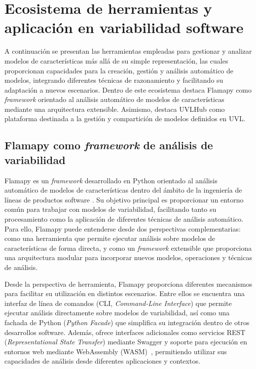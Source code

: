 \section{Ecosistema de herramientas y aplicación en variabilidad software}
\label{sec:ecosistema_herramientas}

A continuación se presentan las herramientas empleadas para gestionar y analizar modelos de características más allá de su simple representación, las cuales proporcionan capacidades para la creación, gestión y análisis automático de modelos, integrando diferentes técnicas de razonamiento y facilitando su adaptación a nuevos escenarios. Dentro de este ecosistema destaca Flamapy como \textit{framework} orientado al análisis automático de modelos de características mediante una arquitectura extensible. Asimismo, destaca UVLHub como plataforma destinada a la gestión y compartición de modelos definidos en UVL.

\subsection{Flamapy como \textit{framework} de análisis de variabilidad}
\label{subsec:flamapy_como_framework}

Flamapy es un \textit{framework} desarrollado en Python orientado al análisis automático de modelos de características dentro del ámbito de la ingeniería de líneas de productos software \cite{flama2023,flamapy}. Su objetivo principal es proporcionar un entorno común para trabajar con modelos de variabilidad, facilitando tanto su procesamiento como la aplicación de diferentes técnicas de análisis automático. Para ello, Flamapy puede entenderse desde dos perspectivas complementarias: como una herramienta que permite ejecutar análisis sobre modelos de características de forma directa, y como un \textit{framework} extensible que proporciona una arquitectura modular para incorporar nuevos modelos, operaciones y técnicas de análisis.

Desde la perspectiva de herramienta, Flamapy proporciona diferentes mecanismos para facilitar su utilización en distintos escenarios. Entre ellos se encuentra una interfaz de línea de comandos (CLI, \textit{Command-Line Interface}) que permite ejecutar análisis directamente sobre modelos de variabilidad, así como una fachada de Python (\textit{Python Facade}) que simplifica su integración dentro de otros desarrollos software. Además, ofrece interfaces adicionales como servicios REST (\textit{Representational State Transfer}) mediante Swagger y soporte para ejecución en entornos web mediante WebAssembly (WASM)~\cite{webassembly}, permitiendo utilizar sus capacidades de análisis desde diferentes aplicaciones y contextos.

